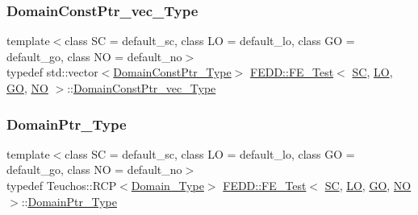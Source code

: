 \mbox{\label{classFEDD_1_1FE__Test_a3345ab320c9e19d77dc7fec9645da0d0}} 
\subsubsection{\texorpdfstring{Domain\+Const\+Ptr\+\_\+vec\+\_\+\+Type}{DomainConstPtr\_vec\_Type}}
{\footnotesize\ttfamily template$<$class SC  = default\+\_\+sc, class LO  = default\+\_\+lo, class GO  = default\+\_\+go, class NO  = default\+\_\+no$>$ \\
typedef std\+::vector$<$\hyperlink{classFEDD_1_1FE__Test_a0a941851908a1e68d1554f8b28a7c72a}{Domain\+Const\+Ptr\+\_\+\+Type}$>$ \hyperlink{classFEDD_1_1FE__Test}{F\+E\+D\+D\+::\+F\+E\+\_\+\+Test}$<$ \hyperlink{fe__test__laplace_8cpp_a79c7e86a57edbb2a5a53242bcd04e41e}{SC}, \hyperlink{fe__test__laplace_8cpp_ad6a38c9f07d3fd633eefca5bccad8410}{LO}, \hyperlink{fe__test__laplace_8cpp_afa2946b509009b4f45eb04bd8c5b27d9}{GO}, \hyperlink{fe__test__laplace_8cpp_a5e24f37b28787429872b6ecb1d0417ce}{NO} $>$\+::\hyperlink{classFEDD_1_1FE__Test_a3345ab320c9e19d77dc7fec9645da0d0}{Domain\+Const\+Ptr\+\_\+vec\+\_\+\+Type}}

\mbox{\label{classFEDD_1_1FE__Test_a1020475c408a64c7926feb8dded7f0c3}} 
\subsubsection{\texorpdfstring{Domain\+Ptr\+\_\+\+Type}{DomainPtr\_Type}}
{\footnotesize\ttfamily template$<$class SC  = default\+\_\+sc, class LO  = default\+\_\+lo, class GO  = default\+\_\+go, class NO  = default\+\_\+no$>$ \\
typedef Teuchos\+::\+R\+CP$<$\hyperlink{classFEDD_1_1FE__Test_a5e414af507a141db0961c32bf6b19825}{Domain\+\_\+\+Type}$>$ \hyperlink{classFEDD_1_1FE__Test}{F\+E\+D\+D\+::\+F\+E\+\_\+\+Test}$<$ \hyperlink{fe__test__laplace_8cpp_a79c7e86a57edbb2a5a53242bcd04e41e}{SC}, \hyperlink{fe__test__laplace_8cpp_ad6a38c9f07d3fd633eefca5bccad8410}{LO}, \hyperlink{fe__test__laplace_8cpp_afa2946b509009b4f45eb04bd8c5b27d9}{GO}, \hyperlink{fe__test__laplace_8cpp_a5e24f37b28787429872b6ecb1d0417ce}{NO} $>$\+::\hyperlink{classFEDD_1_1FE__Test_a1020475c408a64c7926feb8dded7f0c3}{Domain\+Ptr\+\_\+\+Type}}

